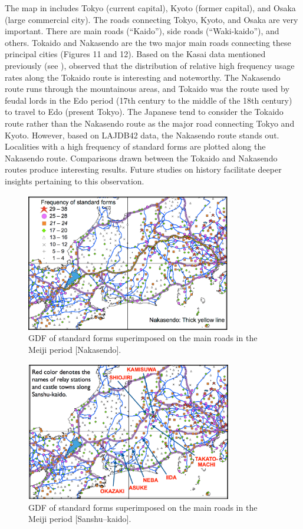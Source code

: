 \documentclass[output=paper]{LSP/langsci}
\begin{document}
The map in  includes Tokyo (current capital), Kyoto (former capital), and Osaka (large commercial city). The roads connecting Tokyo, Kyoto, and Osaka are very important. There are main roads (“Kaido”), side roads (“Waki-kaido”), and others. Tokaido and Nakasendo are the two major main roads connecting these principal cities (Figures 11 and 12). Based on the Kasai data mentioned previously (see ), \citet[184]{tanaka_hyojungo:_1991} observed that the distribution of relative high frequency usage rates along the Tokaido route is interesting and noteworthy. The Nakasendo route runs through the mountainous areas, and Tokaido was the route used by feudal lords in the Edo period (17th century to the middle of the 18th century) to travel to Edo (present Tokyo). The Japanese tend to consider the Tokaido route rather than the Nakasendo route as the major road connecting Tokyo and Kyoto. However, based on LAJDB42 data, the Nakasendo route stands out. Localities with a high frequency of standard forms are plotted along the Nakasendo route. Comparisons drawn between the Tokaido and Nakasendo routes produce interesting results. Future studies on  history facilitate deeper insights pertaining to this observation.

\begin{figure}
\includegraphics[width=0.8\textwidth]{illustrations/kuma_fig09}
\caption{GDF of standard forms superimposed on the main roads in the Meiji period [Nakasendo].}          
\label{fig:9}
\end{figure}

\begin{figure}
\includegraphics[width=0.8\textwidth]{illustrations/kuma_fig10}
\caption{GDF of standard forms superimposed on the main roads in the Meiji period [Sanshu--kaido].}          
\label{fig:10}
\end{figure}
\end{document}
